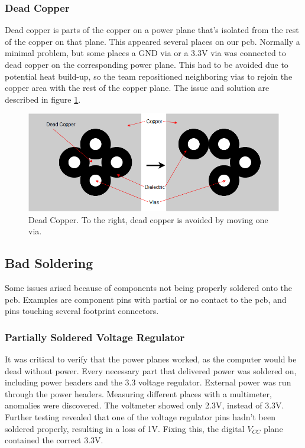 \subsubsection{Dead Copper}
Dead copper is parts of the copper on a power plane that's isolated from the rest of the copper on that plane. 
This appeared several places on our \gls{pcb}. Normally a minimal problem, but some places a GND via or a 3.3V via was connected to dead copper on the corresponding power plane. 
This had to be avoided due to potential heat build-up, so the team repositioned neighboring vias to rejoin the copper area with the rest of the copper plane. The issue and solution are described in figure \ref{fig:Dead copper}.

\begin{figure}[h!]
\centering
\includegraphics[scale = 0.4]{images/Dead_Copper.png}
\caption{Dead Copper. To the right, dead copper is avoided by moving one via.}
\label{fig:Dead copper}
\end{figure}

\subsection{Bad Soldering}
Some issues arised because of components not being properly soldered onto the \gls{pcb}. Examples are component pins with partial or no contact to the \gls{pcb}, and pins touching several footprint connectors.

\subsubsection{Partially Soldered Voltage Regulator} 
It was critical to verify that the power planes worked, as the computer would be dead without power.
Every necessary part that delivered power was soldered on, including power headers and the 3.3 voltage regulator. 
External power was run through the power headers. 
Measuring different places with a multimeter, anomalies were discovered. 
The voltmeter showed only 2.3V, instead of 3.3V. 
Further testing revealed that one of the voltage regulator pins hadn't been soldered properly, resulting in a loss of 1V. 
Fixing this, the digital \(V_{CC}\) plane contained the correct 3.3V.

